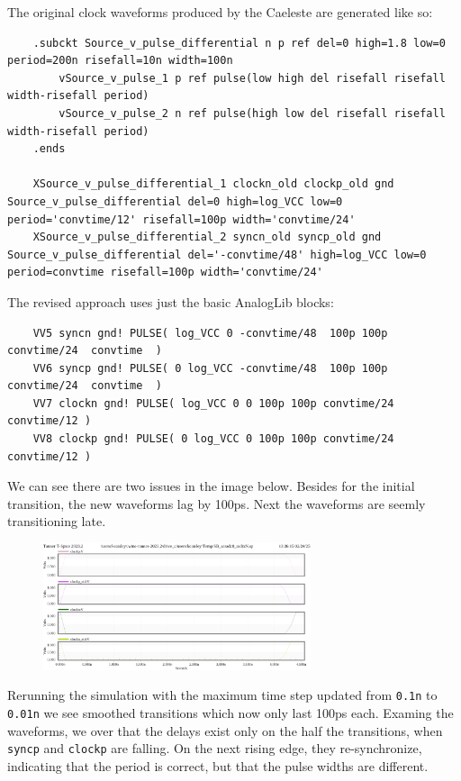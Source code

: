 \documentclass{article}
\begin{document}
 The original clock waveforms produced by the Caeleste are generated like so:

\begin{lstlisting}
    .subckt Source_v_pulse_differential n p ref del=0 high=1.8 low=0 period=200n risefall=10n width=100n
        vSource_v_pulse_1 p ref pulse(low high del risefall risefall width-risefall period)
        vSource_v_pulse_2 n ref pulse(high low del risefall risefall width-risefall period)
    .ends

    XSource_v_pulse_differential_1 clockn_old clockp_old gnd Source_v_pulse_differential del=0 high=log_VCC low=0 period='convtime/12' risefall=100p width='convtime/24'
    XSource_v_pulse_differential_2 syncn_old syncp_old gnd Source_v_pulse_differential del='-convtime/48' high=log_VCC low=0 period=convtime risefall=100p width='convtime/24'
\end{lstlisting}

The revised approach uses just the basic AnalogLib blocks:

\begin{lstlisting}
    VV5 syncn gnd! PULSE( log_VCC 0 -convtime/48  100p 100p convtime/24  convtime  )
    VV6 syncp gnd! PULSE( 0 log_VCC -convtime/48  100p 100p convtime/24  convtime  )
    VV7 clockn gnd! PULSE( log_VCC 0 0 100p 100p convtime/24  convtime/12 ) 
    VV8 clockp gnd! PULSE( 0 log_VCC 0 100p 100p convtime/24  convtime/12 ) 
\end{lstlisting}

We can see there are two issues in the image below. Besides for the initial transition, the new waveforms lag by 100ps. Next the waveforms are seemly transitioning late. 

\begin{figure}[h]
    \centering
    \includegraphics[width=0.7\textwidth]{misaligned_clocks.png}
\end{figure}

\pagebreak

Rerunning the simulation with the maximum time step updated from \texttt{0.1n} to \texttt{0.01n} we see smoothed transitions which now only last 100ps each. Examing the waveforms, we over that the delays exist only on the half the transitions, when \texttt{syncp} and \texttt{clockp} are falling. On the next rising edge, they re-synchronize, indicating that the period is correct, but that the pulse widths are different.
\end{document}
